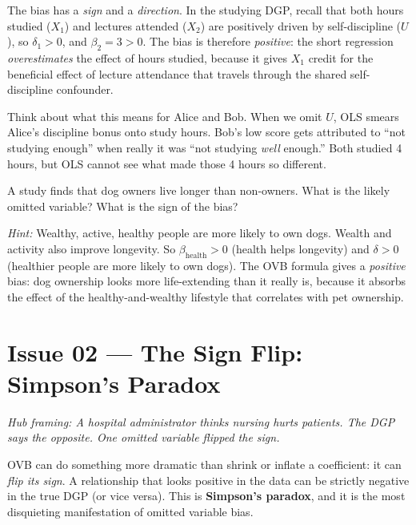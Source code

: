 \documentclass[11pt,a4paper]{article}
\theoremstyle{definition}
\theoremstyle{plain}
\theoremstyle{remark}
\begin{document}
\begin{keyinsight}
The bias has a \emph{sign} and a \emph{direction}.
In the studying DGP, recall that both hours studied ($X_1$) and lectures attended ($X_2$) are positively driven by self-discipline ($U$), so $\delta_1 > 0$, and $\beta_2 = 3 > 0$. The bias is therefore \emph{positive}: the short regression \emph{overestimates} the effect of hours studied, because it gives $X_1$ credit for the beneficial effect of lecture attendance that travels through the shared self-discipline confounder.
\end{keyinsight}

Think about what this means for Alice and Bob. When we omit $U$, OLS smears Alice's discipline bonus onto study hours. Bob's low score gets attributed to ``not studying enough'' when really it was ``not studying \emph{well} enough.'' Both studied 4 hours, but OLS cannot see what made those 4 hours so different.

\begin{tcolorbox}[colback=truthgold!5, colframe=truthgold!80!black, fonttitle=\bfseries, title={Try It Yourself: Sign the Bias}]
A study finds that dog owners live longer than non-owners. What is the likely omitted variable? What is the sign of the bias?

\emph{Hint:} Wealthy, active, healthy people are more likely to own dogs. Wealth and activity also improve longevity. So $\beta_{\text{health}} > 0$ (health helps longevity) and $\delta > 0$ (healthier people are more likely to own dogs). The OVB formula gives a \emph{positive} bias: dog ownership looks more life-extending than it really is, because it absorbs the effect of the healthy-and-wealthy lifestyle that correlates with pet ownership.
\end{tcolorbox}

\section{Issue 02 --- The Sign Flip: Simpson's Paradox}\label{sec:simpson}

\noindent\emph{Hub framing: A hospital administrator thinks nursing hurts patients. The DGP says the opposite. One omitted variable flipped the sign.}

\smallskip

OVB can do something more dramatic than shrink or inflate a coefficient: it can \emph{flip its sign}. A relationship that looks positive in the data can be strictly negative in the true DGP (or vice versa). This is \textbf{Simpson's paradox}, and it is the most disquieting manifestation of omitted variable bias.
\end{document}
